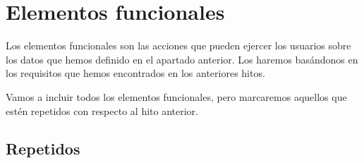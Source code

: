\section{Elementos funcionales}

Los elementos funcionales son las acciones que pueden ejercer los usuarios
sobre los datos que hemos definido en el apartado anterior. Los haremos basándonos
en los requisitos que hemos encontrados en los anteriores hitos.

Vamos a incluir todos los elementos funcionales, pero marcaremos aquellos que estén
repetidos con respecto al hito anterior.

\subsection*{Repetidos}

